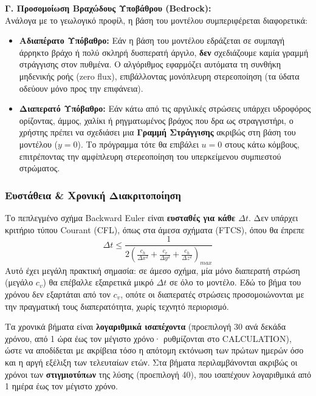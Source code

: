 \documentclass[11pt,a4paper]{article}
\begin{document}
\textbf{Γ. Προσομοίωση Βραχώδους Υποβάθρου (Bedrock):}\\
Ανάλογα με το γεωλογικό προφίλ, η βάση του μοντέλου συμπεριφέρεται διαφορετικά:
\begin{itemize}
  \item \textbf{Αδιαπέρατο Υπόβαθρο:} Εάν η βάση του μοντέλου εδράζεται σε συμπαγή άρρηκτο βράχο ή πολύ σκληρή δυσπερατή άργιλο, \textbf{δεν} σχεδιάζουμε καμία γραμμή στράγγισης στον πυθμένα. Ο αλγόριθμος εφαρμόζει αυτόματα τη συνθήκη μηδενικής ροής (zero flux), επιβάλλοντας μονόπλευρη στερεοποίηση (τα ύδατα οδεύουν μόνο προς την επιφάνεια).
  \item \textbf{Διαπερατό Υπόβαθρο:} Εάν κάτω από τις αργιλικές στρώσεις υπάρχει υδροφόρος ορίζοντας, άμμος, χαλίκι ή ρηγματωμένος βράχος που δρα ως στραγγιστήρι, ο χρήστης πρέπει να σχεδιάσει μια \textbf{Γραμμή Στράγγισης} ακριβώς στη βάση του μοντέλου ($y = 0$). Το πρόγραμμα τότε θα επιβάλει $u = 0$ στους κάτω κόμβους, επιτρέποντας την αμφίπλευρη στερεοποίηση του υπερκείμενου συμπιεστού στρώματος.
\end{itemize}

\subsubsection{Ευστάθεια \& Χρονική Διακριτοποίηση}\label{sec:time}

Το πεπλεγμένο σχήμα Backward Euler είναι \textbf{ευσταθές για κάθε $\Delta t$}. Δεν υπάρχει κριτήριο τύπου Courant (CFL), όπως στα άμεσα σχήματα (FTCS), όπου θα έπρεπε
\begin{equation}
  \Delta t \le \frac{1}{2\left(\frac{c_h}{\Delta x^2} + \frac{c_v}{\Delta y^2} + \frac{c_h}{\Delta z^2}\right)_{max}}
\end{equation}
Αυτό έχει μεγάλη πρακτική σημασία: σε άμεσο σχήμα, μία μόνο διαπερατή στρώση (μεγάλο $c_v$) θα επέβαλλε εξαιρετικά μικρό $\Delta t$ σε όλο το μοντέλο. Εδώ το βήμα του χρόνου δεν εξαρτάται από τον $c_v$, οπότε οι διαπερατές στρώσεις προσομοιώνονται με την πραγματική τους διαπερατότητα, χωρίς τεχνητό περιορισμό.

Τα χρονικά βήματα είναι \textbf{λογαριθμικά ισαπέχοντα} (προεπιλογή 30 ανά δεκάδα χρόνου, από 1 ώρα έως τον μέγιστο χρόνο· ρυθμίζονται στο CALCULATION), ώστε να αποδίδεται με ακρίβεια τόσο η απότομη εκτόνωση των πρώτων ημερών όσο και η αργή εξέλιξη των τελευταίων ετών. Στα βήματα περιλαμβάνονται ακριβώς οι χρόνοι των \textbf{στιγμιοτύπων} της λύσης (προεπιλογή 40), που ισαπέχουν λογαριθμικά από 1 ημέρα έως τον μέγιστο χρόνο.
\end{document}
